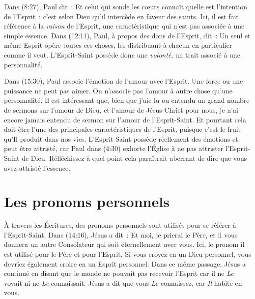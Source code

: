 Dans (8:27), Paul dit~: \og Et celui qui sonde les cœurs
 connaît quelle est l'intention de l'Esprit~: c'est selon Dieu qu'il
 intercède en faveur des saints. \fg{} Ici, il est fait référence
 à la \emph{raison} de l'Esprit, une caractéristique qui n'est pas associée à
 une simple essence. Dans (12:11), Paul, à propos des dons de
 l'Esprit, dit~: \og Un seul et même Esprit opère toutes ces choses, les
 distribuant à chacun en particulier comme il veut. \fg{} L'Esprit-Saint
 possède donc une \emph{volonté}, un trait associé à une personnalité.

Dans (15:30), Paul associe l'émotion de l'amour avec l'Esprit.
 Une force ou une puissance ne peut pas aimer. On n'associe pas l'amour à autre
 chose qu'une personnalité. Il est intéressant que, bien que j'aie lu ou
 entendu un grand nombre de sermons sur l'amour de Dieu, et l'amour de
 Jésus-Christ pour nous, je n'ai encore jamais entendu de sermon sur l'amour de
 l'Esprit-Saint. Et pourtant cela doit être l'une des principales
 caractéristiques de l'Esprit, puisque c'est le fruit qu'Il produit dans nos
 vies. L'Esprit-Saint possède réellement des émotions et peut être attristé,
 car Paul dans (4:30) exhorte l'Église à ne pas attrister
 l'Esprit-Saint de Dieu. Réfléchissez à quel point cela paraîtrait aberrant
 de dire que vous avez attristé l'essence.


\section*{Les pronoms personnels}

À travers les Écritures, des pronoms personnels sont utilisés pour se
 référer à l'Esprit-Saint. Dans (14:16), Jésus a dit~:
 \og Et moi, je prierai le Père, et il vous donnera un autre Consolateur
 qui soit éternellement avec vous. \fg{}
 Ici, le pronom \og il \fg{} est utilisé pour le Père et pour l'Esprit.
 Si vous croyez en un Dieu personnel, vous devriez également croire en
 un Esprit personnel. Dans ce même passage, Jésus a continué en disant
 que le monde ne pouvait pas recevoir l'Esprit car il ne \emph{Le} voyait ni
 ne \emph{Le} connaissait. Jésus a dit que vous \emph{Le} connaissez,
 car \emph{Il} habite en vous.

